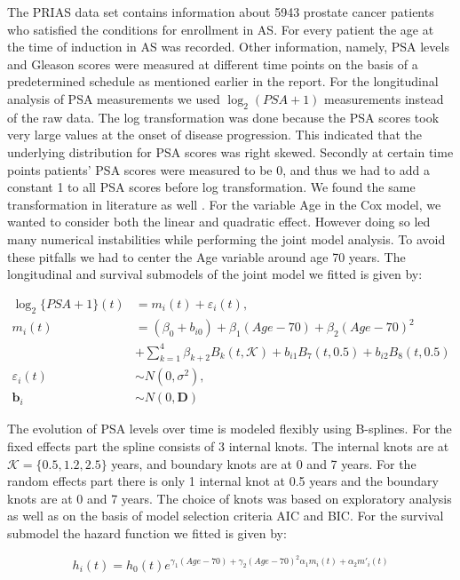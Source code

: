 The PRIAS data set contains information about 5943 prostate cancer patients who satisfied the conditions for enrollment in AS. For every patient the age at the time of induction in AS was recorded. Other information, namely, PSA levels and Gleason scores were measured at different time points on the basis of a predetermined schedule as mentioned earlier in the report. For the longitudinal analysis of PSA measurements we used $\log_2(PSA + 1)$ measurements instead of the raw data. The log transformation was done because the PSA scores took very large values at the onset of disease progression. This indicated that the underlying distribution for PSA scores was right skewed. Secondly at certain time points patients' PSA scores were measured to be 0, and thus we had to add a constant 1 to all PSA scores before log transformation. We found the same transformation in literature as well \cite{mcgreevy2006impact,sene2016individualized}. For the variable Age in the Cox model, we wanted to  consider both the linear and quadratic effect. However doing so led many numerical instabilities while performing the joint model analysis. To avoid these pitfalls we had to center the Age variable around age 70 years. The longitudinal and survival submodels of the joint model we fitted is given by:

\begin{align*}
\log_2\{PSA + 1\}(t) &= m_i(t) + \varepsilon_i(t), \\
m_i(t) &= (\beta_0 + b_{i0}) + \beta_1 (Age-70) + \beta_2 (Age-70)^2\\ 
&+ \sum_{k=1}^4 \beta_{k+2} B_k(t,\mathcal{K}) + b_{i1} B_7(t, 0.5) + b_{i2} B_8(t, 0.5) \\
\varepsilon_i(t) & \sim N(0, \sigma^2),\\
\boldsymbol{b}_i & \sim N(0, \boldsymbol{D})
\end{align*}

The evolution of PSA levels over time is modeled flexibly using B-splines. For the fixed effects part the spline consists of 3 internal knots. The internal knots are at $\mathcal{K} =\{0.5, 1.2, 2.5\}$ years, and boundary knots are at 0 and 7 years. For the random effects part there is only 1 internal knot at 0.5 years and the boundary knots are at 0 and 7 years. The choice of knots was based on exploratory analysis as well as on the basis of model selection criteria AIC and BIC. For the survival submodel the hazard function we fitted is given by:

\begin{equation}
h_i(t) = h_0(t) e^{\gamma_1 (Age-70)  + \gamma_2 (Age-70)^2  \alpha_1 m_i(t) + \alpha_2 m'_i(t)}
\end{equation}

